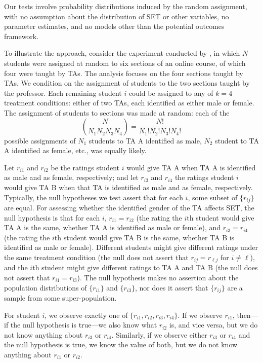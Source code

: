 \documentclass[12pt]{article}
\newcommand{\beq}{\begin{equation}}
\newcommand{\eeq}{\end{equation}}
\begin{document}
Our tests involve probability distributions induced by the random
assignment, with no assumption about the distribution of SET or other variables, 
no parameter estimates, and no models other than the potential outcomes 
framework.

To illustrate the approach, consider the experiment conducted by \citet{MacNell2014},
in which $N$ students were assigned at random to six sections of an online course,
of which four were taught by TAs.
The analysis focuses on the four sections taught by TAs.
We condition on the assignment of students to the two sections taught by the professor.
Each remaining student $i$ could be assigned to any of $k=4$ treatment conditions:
either of two TAs, each identified as either male or female.
The assignment of students to sections was made at random: each of the
\beq
 {{N}\choose{N_1 N_2 N_3 N_4}} = \frac{N!}{N_1! N_2! N_3! N_4!}
\eeq
possible assignments of $N_1$ students to TA A identified as male,
$N_2$ student to TA A identified as female, etc., was equally likely.

Let $r_{i1}$ and $r_{i2}$ be the ratings student $i$ would give TA A when TA 
A is identified as male and as female, respectively; and let 
$r_{i3}$ and $r_{i4}$ the ratings student $i$ would give TA B when that TA
is identified as male and as female, respectively.
Typically, the null hypotheses we test assert that for each $i$, some subset of
$\{r_{ij}\}$ are  equal.
For assessing whether the identified gender of the TA affects SET,
the null hypothesis is that for each $i$,
$r_{i1} = r_{i2}$ (the rating the $i$th student would give TA A is the same,
whether TA A is identified as male or female), 
and $r_{i3} = r_{i4}$ (the rating the $i$th student would give TA B is
the same, whether TA B is identified as male or female).
Different students might give different ratings under the same treatment condition
(the null does not assert that $r_{ij} = r_{\ell j}$ for $i \ne \ell$), and
the $i$th student might 
give different ratings to TA A and TA B
(the null does not assert that $r_{i1} = r_{i3}$).
The null hypothesis makes no assertion about the population distributions of 
$\{r_{i1}\}$ and $\{r_{i3}\}$, nor does it assert that $\{r_{ij}\}$ are 
a sample from some super-population.

For student $i$, we observe exactly one of $\{r_{i1}, r_{i2}, r_{i3}, r_{i4}\}$.
If we observe $r_{i1}$, then---if the null hypothesis is true---we also know what $r_{i2}$ is,
and vice versa, but we do not know anything about $r_{i3}$ or $r_{i4}$.
Similarly, if we observe either $r_{i3}$ or $r_{i4}$ and the null hypothesis is true,
we know the value of both, but we do not know anything about $r_{i1}$ or $r_{i2}$.
\end{document}
